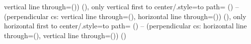 {{{                                         vertical line through={(\tikztotarget)})
    \tikztonodes \ifx\tikz@origtotarget\pgfutil@empty\else\iftikz@ortho@preflush(\tikz@origtotarget)\fi\fi}},
  only vertical first to center/.style={to path={
      \pgfextra
        \let\tikz@origtotarget\tikztotarget
      \endpgfextra
    (\tikztostart) -- (perpendicular cs: vertical line through={(\tikztostart)},
                                         horizontal line through={(\tikztotarget)})
    \tikztonodes \ifx\tikz@origtotarget\pgfutil@empty\else\iftikz@ortho@preflush(\tikz@origtotarget)\fi\fi}},
  only horizontal first to center/.style={to path={
      \pgfextra
        \let\tikz@origtotarget\tikztotarget
      \endpgfextra
    (\tikztostart) -- (perpendicular cs: horizontal line through={(\tikztostart)},
                                         vertical line through={(\tikztotarget)})
    \tikztonodes \ifx\tikz@origtotarget\pgfutil@empty\else\iftikz@ortho@preflush(\tikz@origtotarget)\fi\fi}}%
}
\endinput

